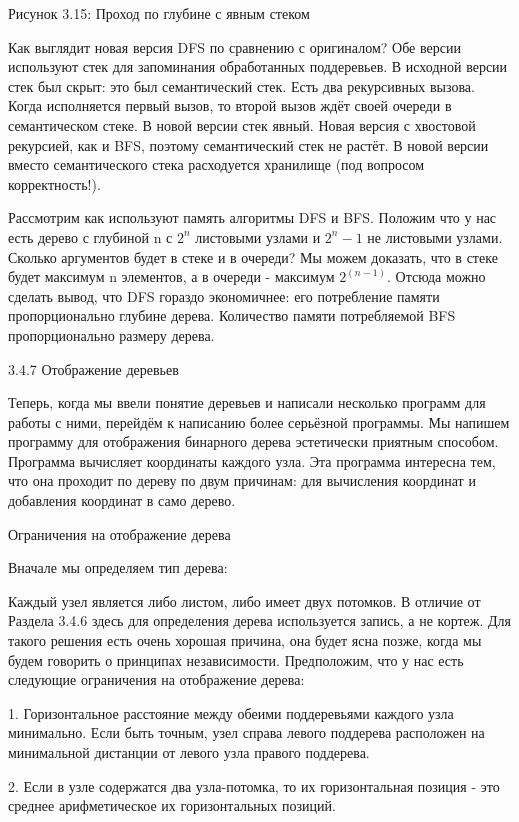 Рисунок 3.15: Проход по глубине с явным стеком

Как выглядит новая версия DFS по сравнению с оригиналом? Обе версии используют стек для запоминания обработанных поддеревьев. В исходной версии стек был скрыт: это был семантический стек. Есть два рекурсивных вызова. Когда исполняется первый вызов, то второй вызов ждёт своей очереди в семантическом стеке. В новой версии стек явный. Новая версия с хвостовой рекурсией, как и BFS, поэтому семантический стек не растёт. В новой версии вместо семантического стека расходуется хранилище (под вопросом корректность!).

Рассмотрим как используют память алгоритмы DFS и BFS. Положим что у нас есть дерево с глубиной n с $2^n$ листовыми узлами и $2^n-1$ не листовыми узлами. Сколько аргументов будет в стеке и в очереди? Мы можем доказать, что в стеке будет максимум n элементов, а в очереди - максимум $2^(n-1)$. Отсюда можно сделать вывод, что DFS гораздо экономичнее: его потребление памяти пропорционально глубине дерева. Количество памяти потребляемой BFS пропорционально размеру дерева.

3.4.7 Отображение деревьев

Теперь, когда мы ввели понятие деревьев и написали несколько программ для работы с ними, перейдём к написанию более серьёзной программы. Мы напишем программу для отображения бинарного дерева эстетически приятным способом. Программа вычисляет координаты каждого узла. Эта программа интересна тем, что она проходит по дереву по двум причинам: для вычисления координат и добавления координат в само дерево.

Ограничения на отображение дерева

Вначале мы определяем тип дерева:

Каждый узел является либо листом, либо имеет двух потомков. В отличие от Раздела 3.4.6 здесь для определения дерева используется запись, а не кортеж. Для такого решения есть очень хорошая причина, она будет ясна позже, когда мы будем говорить о принципах независимости. Предположим, что у нас есть следующие ограничения на отображение дерева:

1. Горизонтальное расстояние между обеими поддеревьями каждого узла минимально. Если быть точным, узел справа левого поддерева расположен на минимальной дистанции от левого узла правого поддерева.

2. Если в узле содержатся два узла-потомка, то их горизонтальная позиция - это среднее арифметическое их горизонтальных позиций.

